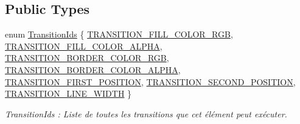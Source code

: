 \subsection*{Public Types}
\begin{DoxyCompactItemize}
\item 
enum \hyperlink{classns_shape_1_1_line_a446a1bbc370b3426afe05f22b681ea58}{Transition\+Ids} \{ \newline
\hyperlink{classns_shape_1_1_line_a446a1bbc370b3426afe05f22b681ea58a9f84f457c9a24574ae17018656830364}{T\+R\+A\+N\+S\+I\+T\+I\+O\+N\+\_\+\+F\+I\+L\+L\+\_\+\+C\+O\+L\+O\+R\+\_\+\+R\+GB}, 
\hyperlink{classns_shape_1_1_line_a446a1bbc370b3426afe05f22b681ea58a2860b432942d04ad21cf17a11776b748}{T\+R\+A\+N\+S\+I\+T\+I\+O\+N\+\_\+\+F\+I\+L\+L\+\_\+\+C\+O\+L\+O\+R\+\_\+\+A\+L\+P\+HA}, 
\hyperlink{classns_shape_1_1_line_a446a1bbc370b3426afe05f22b681ea58ab4facc5aca748b4570273d0b13813dda}{T\+R\+A\+N\+S\+I\+T\+I\+O\+N\+\_\+\+B\+O\+R\+D\+E\+R\+\_\+\+C\+O\+L\+O\+R\+\_\+\+R\+GB}, 
\hyperlink{classns_shape_1_1_line_a446a1bbc370b3426afe05f22b681ea58ad2f2a6854611b0b18a8d1805cfca13f1}{T\+R\+A\+N\+S\+I\+T\+I\+O\+N\+\_\+\+B\+O\+R\+D\+E\+R\+\_\+\+C\+O\+L\+O\+R\+\_\+\+A\+L\+P\+HA}, 
\newline
\hyperlink{classns_shape_1_1_line_a446a1bbc370b3426afe05f22b681ea58ade8f8b210eda14b4f6e940f8f72346f8}{T\+R\+A\+N\+S\+I\+T\+I\+O\+N\+\_\+\+F\+I\+R\+S\+T\+\_\+\+P\+O\+S\+I\+T\+I\+ON}, 
\hyperlink{classns_shape_1_1_line_a446a1bbc370b3426afe05f22b681ea58a55cf135d3e37710549d41ae3faf0f80b}{T\+R\+A\+N\+S\+I\+T\+I\+O\+N\+\_\+\+S\+E\+C\+O\+N\+D\+\_\+\+P\+O\+S\+I\+T\+I\+ON}, 
\hyperlink{classns_shape_1_1_line_a446a1bbc370b3426afe05f22b681ea58a58ffbb046bb10ae9ed84a672d9daea03}{T\+R\+A\+N\+S\+I\+T\+I\+O\+N\+\_\+\+L\+I\+N\+E\+\_\+\+W\+I\+D\+TH}
 \}\begin{DoxyCompactList}\small\item\em Transition\+Ids \+: Liste de toutes les transitions que cet élément peut exécuter. \end{DoxyCompactList}
\end{DoxyCompactItemize}
